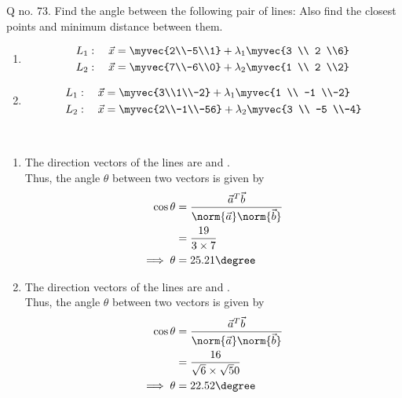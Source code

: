 \documentclass[journal,12pt,twocolumn]{IEEEtran}
\begin{document}
\noindent Q no. 73. Find the angle between the following pair of lines: Also find the closest points and minimum distance between them.
\begin{enumerate}
\item
\begin{align}
L_1: \quad \vec{x} &= \myvec{2\\-5\\1} + \lambda_1\myvec{3 \\ 2 \\6}
\\
L_2: \quad \vec{x} &= \myvec{7\\-6\\0} + \lambda_2\myvec{1 \\ 2 \\2}
\end{align}
\item
\begin{align}
L_1: \quad \vec{x} &= \myvec{3\\1\\-2} + \lambda_1\myvec{1 \\ -1 \\-2}
\\
L_2: \quad \vec{x} &= \myvec{2\\-1\\-56} + \lambda_2\myvec{3 \\ -5 \\-4}
\end{align}
\end{enumerate}
%
\\
\solution 
\begin{enumerate}
\item The direction vectors of the lines are
 and . \\
Thus, the angle $\theta$ between two vectors is given by 
%
\begin{align}
\label{eq:line_scalar_prod}
\cos \theta &= \frac{\vec{a}^T\vec{b}}{\norm{\vec{a}}\norm{\vec{b}}}
\\
&=\frac{19}{3\times7}
\\
\implies \theta &= 25.21\degree
\end{align}
\item The direction vectors of the lines are
 and . \\
Thus, the angle $\theta$ between two vectors is given by 
%
\begin{align}
\label{eq:line_scalar_prod}
\cos \theta &= \frac{\vec{a}^T\vec{b}}{\norm{\vec{a}}\norm{\vec{b}}}
\\
&=\frac{16}{\sqrt6\times\sqrt50}
\\
\implies \theta &= 22.52\degree
\end{align}
\end{enumerate} 
\end{document}
